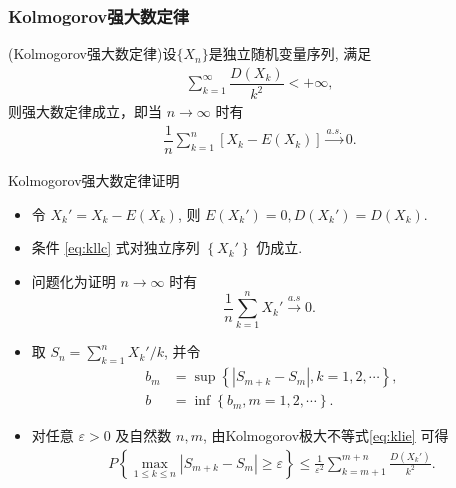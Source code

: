 \documentclass[Prob-All.tex]{subfiles}
\begin{document}
\begin{frame}
	\frametitle{Kolmogorov强大数定律}

	\begin{thm}
		(Kolmogorov强大数定律)设$\{X_n\}$是独立随机变量序列, 满足
		\begin{eqnarray}\label{eq:kllc}
			\sum_{k=1}^\infty\dfrac{D(X_k)}{k^2}<+\infty,
		\end{eqnarray}
		则强大数定律成立，即当 $n\rightarrow\infty$ 时有
		\begin{eqnarray*}
			\dfrac{1}{n}\sum_{k=1}^n[X_k-E(X_k)]\stackrel{a.s.}{\rightarrow}0.\end{eqnarray*}

	\end{thm}





\end{frame}

\begin{frame}{Kolmogorov强大数定律证明}
\begin{itemize}[<+-|alert@+>]
	\item 令 \( X_{k}'=X_{k}-E\left(X_{k}\right) \), 则 \( E\left(X_{k}'\right)=0, D\left(X_{k}'\right)=D\left(X_{k}\right) \).
	\item  条件 \eqref{eq:kllc} 式对独立序列 \( \left\{X_{k}'\right\} \) 仍成立.
	\item 问题化为证明 \( n \rightarrow \infty \) 时有
	\[
	\frac{1}{n} \sum_{k=1}^{n} X_{k}' \stackrel{a . s}{\longrightarrow} 0 \text {. }
	\]

	\item 取 \( S_{n}=\sum_{k=1}^{n} X_{k}' / k \), 并令
\begin{align*}
	b_{m}&=\sup \left\{\left|S_{m+k}-S_{m}\right|, k=1,2, \cdots\right\},\\
	b&=\inf \left\{b_{m},  m=1,2, \cdots\right\}.
\end{align*}
\item 对任意 ${\varepsilon>0}$ 及自然数 $n, m$, 由Kolmogorov极大不等式\eqref{eq:klie} 可得
\begin{align}\label{eq:klie-2}
	P\left\{\max _{1 \leq k \leq n}\left|S_{m+k}-S_{m}\right| \geq \varepsilon\right\} \leq \frac{1}{\varepsilon^{2}} \sum_{k=m+1}^{m+n} \frac{D\left(X_{k}'\right)}{k^{2}} .
\end{align}


\end{itemize}

\end{frame}
\end{document}
